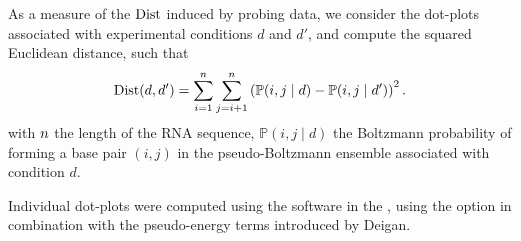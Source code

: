 \documentclass[a4,center,fleqn]{NAR}
\begin{document}
As a measure of the  ${ \text{Dist}}$ induced by probing data, we consider the dot-plots associated with experimental conditions $d$ and $d'$, and compute the squared Euclidean distance, such that
$${ \text{Dist}} (d,d')=\sum\limits_{i=1}^{n}\sum\limits_{j=i+1}^{n} \left(\mathbb{P}(i,j\mid d)-\mathbb{P}(i,j\mid d')\right)^2.$$
with ${n}$ the length of the RNA sequence,  $\mathbb{P}(i,j\mid d)$ the Boltzmann probability of forming a base pair $(i,j)$ in the pseudo-Boltzmann ensemble associated with condition $d$.


Individual dot-plots were computed using the  software in the , using the  option in combination with the pseudo-energy terms introduced by Deigan\etal\cite{Deigan2009}. 




\end{document}
